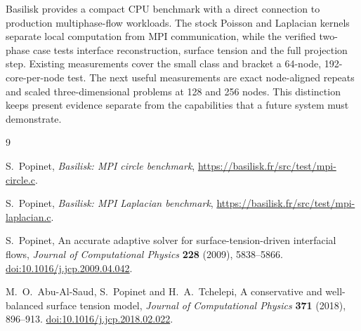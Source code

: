 \documentclass[11pt,a4paper]{article}
\begin{document}
Basilisk provides a compact CPU benchmark with a direct connection to
production multiphase-flow workloads. The stock Poisson and Laplacian kernels
separate local computation from MPI communication, while the verified
two-phase case tests interface reconstruction, surface tension and the full
projection step. Existing measurements cover the small class and bracket a
64-node, 192-core-per-node test. The next useful measurements are exact
node-aligned repeats and scaled three-dimensional problems at 128 and 256
nodes. This distinction keeps present evidence separate from the capabilities
that a future system must demonstrate.

\begin{thebibliography}{9}

S.~Popinet,
\newblock \emph{Basilisk: MPI circle benchmark},
\newblock \url{https://basilisk.fr/src/test/mpi-circle.c}.

S.~Popinet,
\newblock \emph{Basilisk: MPI Laplacian benchmark},
\newblock \url{https://basilisk.fr/src/test/mpi-laplacian.c}.

S.~Popinet,
\newblock An accurate adaptive solver for surface-tension-driven interfacial
flows,
\newblock \emph{Journal of Computational Physics} \textbf{228} (2009),
5838--5866. \href{https://doi.org/10.1016/j.jcp.2009.04.042}{doi:10.1016/j.jcp.2009.04.042}.

M.~O.~Abu-Al-Saud, S.~Popinet and H.~A.~Tchelepi,
\newblock A conservative and well-balanced surface tension model,
\newblock \emph{Journal of Computational Physics} \textbf{371} (2018),
896--913. \href{https://doi.org/10.1016/j.jcp.2018.02.022}{doi:10.1016/j.jcp.2018.02.022}.

\end{thebibliography}
\end{document}
